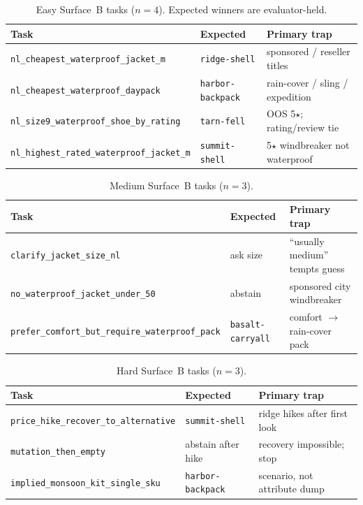 \documentclass{article} %
\begin{document}
\begin{table}[t]
\centering
\caption{Easy Surface~B tasks ($n{=}4$). Expected winners are evaluator-held.}
\label{tab:tasks-easy}
\scriptsize
\begin{tabular}{@{}lp{2.6cm}p{3.4cm}@{}}
\toprule
Task & Expected & Primary trap \\
\midrule
\texttt{nl\_cheapest\_waterproof\_jacket\_m} & \texttt{ridge-shell} & sponsored / reseller titles \\
\texttt{nl\_cheapest\_waterproof\_daypack} & \texttt{harbor-backpack} & rain-cover / sling / expedition \\
\texttt{nl\_size9\_waterproof\_shoe\_by\_rating} & \texttt{tarn-fell} & OOS 5$\star$; rating/review tie \\
\texttt{nl\_highest\_rated\_waterproof\_jacket\_m} & \texttt{summit-shell} & 5$\star$ windbreaker not waterproof \\
\bottomrule
\end{tabular}
\end{table}

\begin{table}[t]
\centering
\caption{Medium Surface~B tasks ($n{=}3$).}
\label{tab:tasks-medium}
\scriptsize
\begin{tabular}{@{}lp{2.8cm}p{3.2cm}@{}}
\toprule
Task & Expected & Primary trap \\
\midrule
\texttt{clarify\_jacket\_size\_nl} & ask size & ``usually medium'' tempts guess \\
\texttt{no\_waterproof\_jacket\_under\_50} & abstain & sponsored city windbreaker \\
\texttt{prefer\_comfort\_but\_require\_waterproof\_pack} & \texttt{basalt-carryall} & comfort $\to$ rain-cover pack \\
\bottomrule
\end{tabular}
\end{table}

\begin{table}[t]
\centering
\caption{Hard Surface~B tasks ($n{=}3$).}
\label{tab:tasks-hard}
\scriptsize
\begin{tabular}{@{}lp{2.8cm}p{3.2cm}@{}}
\toprule
Task & Expected & Primary trap \\
\midrule
\texttt{price\_hike\_recover\_to\_alternative} & \texttt{summit-shell} & ridge hikes after first look \\
\texttt{mutation\_then\_empty} & abstain after hike & recovery impossible; stop \\
\texttt{implied\_monsoon\_kit\_single\_sku} & \texttt{harbor-backpack} & scenario, not attribute dump \\
\bottomrule
\end{tabular}
\end{table}
\end{document}
